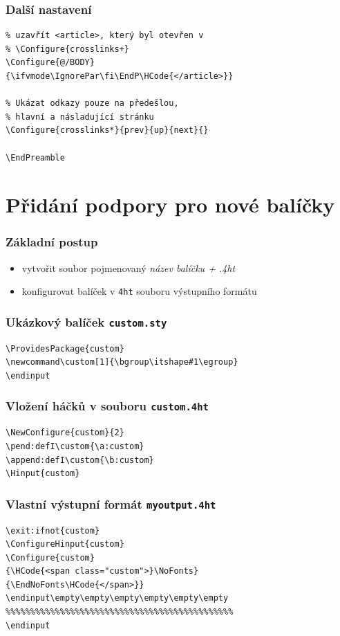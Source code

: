\begin{frame}[fragile]
  \frametitle{Další nastavení}
  \begin{verbatim}
% uzavřít <article>, který byl otevřen v 
% \Configure{crosslinks+}
\Configure{@/BODY}
{\ifvmode\IgnorePar\fi\EndP\HCode{</article>}}

% Ukázat odkazy pouze na předešlou, 
% hlavní a násladující stránku
\Configure{crosslinks*}{prev}{up}{next}{}

\EndPreamble
\end{verbatim}
\end{frame}

\section{Přidání podpory pro nové balíčky}

\begin{frame}
  \frametitle{Základní postup}
  \begin{itemize}
    \item vytvořit soubor pojmenovaný \textit{název balíčku + .4ht}
    \item konfigurovat balíček v \texttt{4ht} souboru výstupního formátu
  \end{itemize}
\end{frame}


\begin{frame}[fragile]
  \frametitle{Ukázkový balíček \texttt{custom.sty}}
  \begin{verbatim}
\ProvidesPackage{custom}
\newcommand\custom[1]{\bgroup\itshape#1\egroup}
\endinput
  \end{verbatim}
\end{frame}

\begin{frame}[fragile]
  \frametitle{Vložení háčků v souboru \texttt{custom.4ht}}
  \begin{verbatim}
\NewConfigure{custom}{2}
\pend:defI\custom{\a:custom}
\append:defI\custom{\b:custom}
\Hinput{custom}
  \end{verbatim}
\end{frame}


\begin{frame}[fragile]
  \frametitle{Vlastní výstupní formát \texttt{myoutput.4ht}}
  \begin{verbatim}
\exit:ifnot{custom} 
\ConfigureHinput{custom} 
\Configure{custom}
{\HCode{<span class="custom">}\NoFonts}
{\EndNoFonts\HCode{</span>}}
\endinput\empty\empty\empty\empty\empty\empty 
%%%%%%%%%%%%%%%%%%%%%%%%%%%%%%%%%%%%%%%%%%%%%%
\endinput 
  \end{verbatim}
\end{frame}

